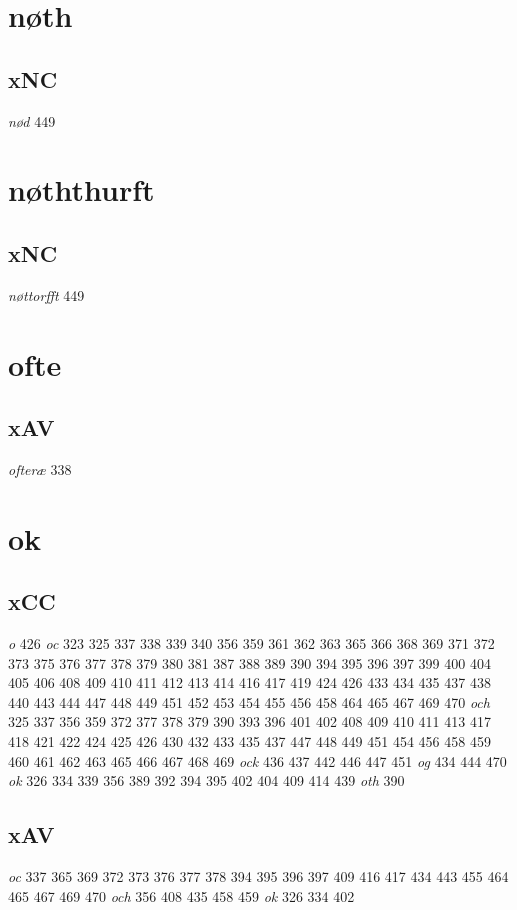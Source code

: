 \documentclass[a4paper,twocolumn]{article}
\begin{document}
\section{nøth}
\label{sec:org370e047}
\subsection{xNC}
\label{sec:orgc845988}
\emph{nød} 449 
\section{nøththurft}
\label{sec:org3c95c2e}
\subsection{xNC}
\label{sec:orged929e9}
\emph{nøttorfft} 449 
\section{ofte}
\label{sec:orgfb11a9c}
\subsection{xAV}
\label{sec:org0f7ae97}
\emph{ofteræ} 338 
\section{ok}
\label{sec:orgc8fc51a}
\subsection{xCC}
\label{sec:org0e20989}
\emph{o} 426 \emph{oc} 323 325 337 338 339 340 356 359 361 362 363 365 366 368 369 371 372 373 375 376 377 378 379 380 381 387 388 389 390 394 395 396 397 399 400 404 405 406 408 409 410 411 412 413 414 416 417 419 424 426 433 434 435 437 438 440 443 444 447 448 449 451 452 453 454 455 456 458 464 465 467 469 470 \emph{och} 325 337 356 359 372 377 378 379 390 393 396 401 402 408 409 410 411 413 417 418 421 422 424 425 426 430 432 433 435 437 447 448 449 451 454 456 458 459 460 461 462 463 465 466 467 468 469 \emph{ock} 436 437 442 446 447 451 \emph{og} 434 444 470 \emph{ok} 326 334 339 356 389 392 394 395 402 404 409 414 439 \emph{oth} 390 
\subsection{xAV}
\label{sec:orgb0d47bb}
\emph{oc} 337 365 369 372 373 376 377 378 394 395 396 397 409 416 417 434 443 455 464 465 467 469 470 \emph{och} 356 408 435 458 459 \emph{ok} 326 334 402 
\end{document}

